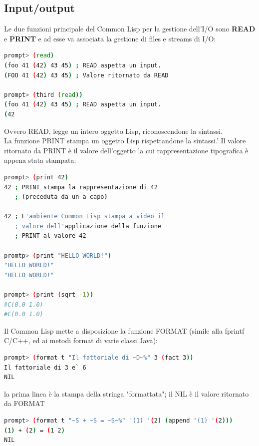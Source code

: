 \documentclass[a4paper,12pt, oneside]{book}
\begin{document}
\subsection{Input/output}
Le due funzioni principale del Common Lisp per la gestione
dell'I/O sono \textbf{READ} e \textbf{PRINT} e ad esse va associata la gestione di files e streams di I/O:
\begin{shaded}
	\begin{lstlisting}[language=bash]
prompt> (read)
(foo 41 (42) 43 45) ; READ aspetta un input.
(FOO 41 (42) 43 45) ; Valore ritornato da READ

prompt> (third (read))
(foo 41 (42) 43 45) ; READ aspetta un input.
(42
\end{lstlisting}
\end{shaded}
Ovvero READ, legge un intero oggetto Lisp,
riconoscendone la sintassi.\\La funzione PRINT stampa un oggetto Lisp rispettandone la sintassi.'
Il valore ritornato da PRINT è il valore dell'oggetto la cui rappresentazione tipografica è
appena stata stampata:
\begin{shaded}
	\begin{lstlisting}[language=bash]
prompt> (print 42)
42 ; PRINT stampa la rappresentazione di 42
   ; (preceduta da un a-capo)

42 ; L'ambiente Common Lisp stampa a video il
   ; valore dell'applicazione della funzione
   ; PRINT al valore 42
   
promtp> (print "HELLO WORLD!")
"HELLO WORLD!"
"HELLO WORLD!"

prompt> (print (sqrt -1))
#C(0.0 1.0)
#C(0.0 1.0) 
\end{lstlisting}
\end{shaded}
Il Common Lisp mette a disposizione la funzione FORMAT (simile alla
fprintf C/C++, ed ai metodi format di varie classi Java):
\begin{shaded}
	\begin{lstlisting}[language=bash]
prompt> (format t "Il fattoriale di ~D~%" 3 (fact 3))
Il fattoriale di 3 e` 6
NIL
\end{lstlisting}
\end{shaded}
la prima linea è la stampa della stringa "formattata"; il NIL è il valore
ritornato da FORMAT
\begin{shaded}
	\begin{lstlisting}[language=bash]
prompt> (format t "~S + ~S = ~S~%" '(1) '(2) (append '(1) '(2)))
(1) + (2) = (1 2)
NIL
\end{lstlisting}
\end{shaded}
\end{document}

